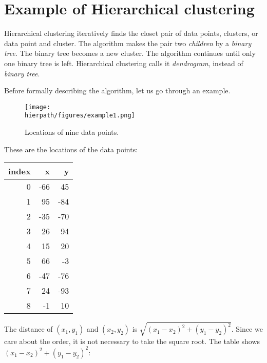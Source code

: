 
\section{Example of 
Hierarchical clustering}

Hierarchical clustering iteratively finds the closet pair of data
points, clusters, or data point and cluster. The algorithm makes the
pair two {\it children} by a {\it binary tree}.  The binary tree
becomes a new cluster.  The algorithm continues until only one binary
tree is left.  Hierarchical clustering calls it {\it dendrogram}, instead
of {\it binary tree}.

Before formally describing the algorithm, let us go through an example.

\begin{figure}[h] \centering
{\texttt{[image: \\hierpath/figures/example1.png]}}
\caption{Locations of nine data points. }
\end{figure}

These are the locations of the data points:

\hspace{0.1in}
\begin{tt}
\begin{tabular}{|r|rr|} \hline
{\bf index} &  {\bf x} & {\bf y} \\ \hline
0 &  -66  &  45 \\
1 & 95  &  -84 \\
2 & -35  &  -70 \\
3 & 26  &  94 \\
4 & 15  &  20 \\
5 & 66  &  -3 \\
6 & -47  &  -76 \\
7 & 24  &  -93 \\
8 & -1  &  10 \\ \hline
\end{tabular}
\end{tt}
\hspace{0.1in}

The distance of $(x_1, y_1)$ and $(x_2, y_2)$ is $\sqrt{(x_1 - x_2)^2
    + (y_1 - y_2)^2}$. Since we care about the order, it is not
necessary to take the square root.  The table
shows
${(x_1 - x_2)^2
    + (y_1 - y_2)^2}$:

